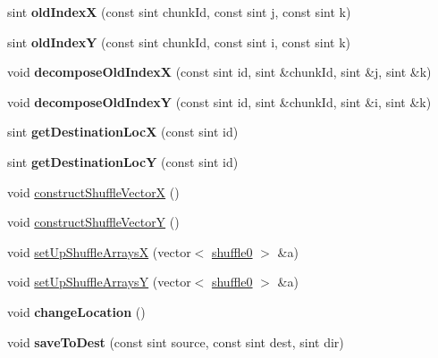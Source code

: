 \begin{DoxyCompactItemize}
sint {\bfseries old\+IndexX} (const sint chunk\+Id, const sint j, const sint k)
\item 
\mbox{\label{classPencilDcmp_acb2bb843a6d1f5ae6d9ef2caef199565}} 
sint {\bfseries old\+IndexY} (const sint chunk\+Id, const sint i, const sint k)
\item 
\mbox{\label{classPencilDcmp_ab70b1280876b069d3821a660d03b70f3}} 
void {\bfseries decompose\+Old\+IndexX} (const sint id, sint \&chunk\+Id, sint \&j, sint \&k)
\item 
\mbox{\label{classPencilDcmp_a75078d6a97a8dec9345cca6f88602b3b}} 
void {\bfseries decompose\+Old\+IndexY} (const sint id, sint \&chunk\+Id, sint \&i, sint \&k)
\item 
\mbox{\label{classPencilDcmp_a9469d4a1462fd2ee0e490dd31c2694a3}} 
sint {\bfseries get\+Destination\+LocX} (const sint id)
\item 
\mbox{\label{classPencilDcmp_ae115f372f1da771deba940df5b650e17}} 
sint {\bfseries get\+Destination\+LocY} (const sint id)
\item 
void \mbox{\hyperlink{classPencilDcmp_a2076e314ec80c355137c743450c31d0b}{construct\+Shuffle\+VectorX}} ()
\item 
void \mbox{\hyperlink{classPencilDcmp_a41667d2540bb3f3435acd5f5af7db2e4}{construct\+Shuffle\+VectorY}} ()
\item 
void \mbox{\hyperlink{classPencilDcmp_a8ea122a3a5c4f6481fce20d8ac8e87f6}{set\+Up\+Shuffle\+ArraysX}} (vector$<$ \mbox{\hyperlink{structshuffle}{shuffle0}} $>$ \&a)
\item 
void \mbox{\hyperlink{classPencilDcmp_a30bae43ce292f1ddb54e16c3b0f6bbfd}{set\+Up\+Shuffle\+ArraysY}} (vector$<$ \mbox{\hyperlink{structshuffle}{shuffle0}} $>$ \&a)
\item 
\mbox{\label{classPencilDcmp_af3f6394865e0b11848459191ad108acd}} 
void {\bfseries change\+Location} ()
\item 
\mbox{\label{classPencilDcmp_ab9f56baf0c40ff4b14600ced7c0aed28}} 
void {\bfseries save\+To\+Dest} (const sint source, const sint dest, sint dir)
\item 
\mbox{\label{classPencilDcmp_aaeccaa40492d3fc5ae44cb1b003a395c}} 

\end{DoxyCompactItemize}
